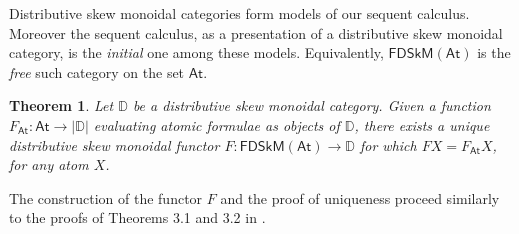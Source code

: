 \documentclass[submission,copyright,creativecommons]{eptcs}
\newtheorem{theorem}{Theorem}[section]
\theoremstyle{definition}
\newcommand{\FSkMCC}{\mathsf{FDSkM}}
\begin{document}
Distributive skew monoidal categories form models of our sequent calculus.
Moreover the sequent calculus, as a presentation of a distributive skew monoidal category, is the \emph{initial} one among these
models. Equivalently, $\FSkMCC(\mathsf{At})$ is the \emph{free}
such category on the set $\mathsf{At}$.
\begin{theorem}\label{thm:models}
  Let $\mathbb{D}$ be a distributive skew monoidal category. Given a function $F_{\mathsf{At}} : \mathsf{At} \rightarrow |\mathbb{D}|$ evaluating atomic formulae as objects of $\mathbb{D}$, there exists a unique distributive skew monoidal functor \linebreak$F : \FSkMCC(\mathsf{At}) \rightarrow \mathbb{D}$ for which $F X = F_{\mathsf{At}} X$, for any atom $X$.
\end{theorem}
The construction of the functor $F$ and the proof of uniqueness proceed similarly to the proofs of Theorems 3.1 and 3.2 in \cite{UVW:protsn}.
\end{document}
